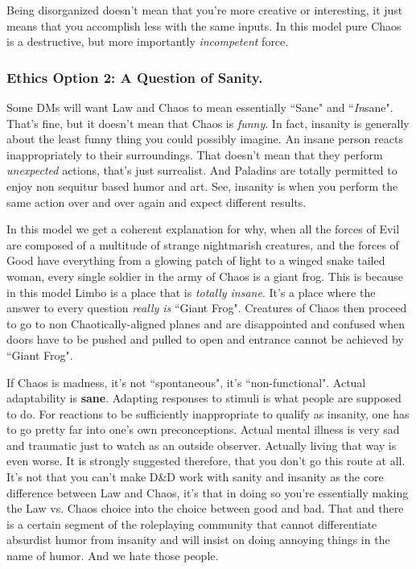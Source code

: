 Being disorganized doesn't mean that you're more creative or interesting, it just means that you accomplish less with the same inputs. In this model pure Chaos is a destructive, but more importantly \textit{incompetent} force.

\subsubsection{Ethics Option 2: A Question of Sanity.}
Some DMs will want Law and Chaos to mean essentially ``Sane" and ``\textit{In}sane". That's fine, but it doesn't mean that Chaos is \textit{funny}. In fact, insanity is generally about the least funny thing you could possibly imagine. An insane person reacts inappropriately to their surroundings. That doesn't mean that they perform \textit{unexpected} actions, that's just surrealist. And Paladins are totally permitted to enjoy non sequitur based humor and art. See, insanity is when you perform the same action over and over again and expect different results.

In this model we get a coherent explanation for why, when all the forces of Evil are composed of a multitude of strange nightmarish creatures, and the forces of Good have everything from a glowing patch of light to a winged snake tailed woman, every single soldier in the army of Chaos is a giant frog. This is because in this model Limbo is a place that is \textit{totally insane}. It's a place where the answer to every question \textit{really is} ``Giant Frog". Creatures of Chaos then proceed to go to non Chaotically-aligned planes and are disappointed and confused when doors have to be pushed and pulled to open and entrance cannot be achieved by ``Giant Frog".

If Chaos is madness, it's not ``spontaneous", it's ``non-functional". Actual adaptability is \textbf{sane}. Adapting responses to stimuli is what people are supposed to do. For reactions to be sufficiently inappropriate to qualify as insanity, one has to go pretty far into one's own preconceptions. Actual mental illness is very sad and traumatic just to watch as an outside observer. Actually living that way is even worse. It is strongly suggested therefore, that you don't go this route at all. It's not that you can't make D\&D work with sanity and insanity as the core difference between Law and Chaos, it's that in doing so you're essentially making the Law vs. Chaos choice into the choice between good and bad. That and there is a certain segment of the roleplaying community that cannot differentiate absurdist humor from insanity and will insist on doing annoying things in the name of humor. And we hate those people.

